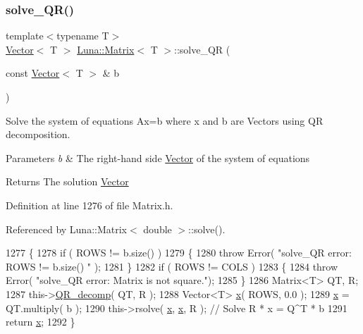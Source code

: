 \subsubsection{\texorpdfstring{solve\+\_\+\+Q\+R()}{solve\_QR()}}
{\footnotesize\ttfamily template$<$typename T$>$ \\
\hyperlink{classLuna_1_1Vector}{Vector}$<$ T $>$ \hyperlink{classLuna_1_1Matrix}{Luna\+::\+Matrix}$<$ T $>$\+::solve\+\_\+\+QR (\begin{DoxyParamCaption}\item[{const \hyperlink{classLuna_1_1Vector}{Vector}$<$ T $>$ \&}]{b }\end{DoxyParamCaption})\hspace{0.3cm}{\ttfamily [inline]}}



Solve the system of equations Ax=b where x and b are Vectors using QR decomposition. 


\begin{DoxyParams}{Parameters}
{\em b} & The right-\/hand side \hyperlink{classLuna_1_1Vector}{Vector} of the system of equations \\
\hline
\end{DoxyParams}
\begin{DoxyReturn}{Returns}
The solution \hyperlink{classLuna_1_1Vector}{Vector} 
\end{DoxyReturn}


Definition at line 1276 of file Matrix.\+h.



Referenced by Luna\+::\+Matrix$<$ double $>$\+::solve().


\begin{DoxyCode}
1277   \{
1278     \textcolor{keywordflow}{if} ( ROWS != b.size() )
1279     \{
1280       \textcolor{keywordflow}{throw} Error( \textcolor{stringliteral}{"solve\_QR error: ROWS != b.size() "} );
1281     \}
1282     \textcolor{keywordflow}{if} ( ROWS != COLS )
1283     \{
1284       \textcolor{keywordflow}{throw} Error( \textcolor{stringliteral}{"solve\_QR error: Matrix is not square."});
1285     \}
1286     Matrix<T> QT, R;
1287     this->\hyperlink{classLuna_1_1Matrix_aad8367cf9e292301e40c24c4011a2e8f}{QR\_decomp}( QT, R );
1288     Vector<T> \hyperlink{namespaceHeat__plot_aa88370c16b85b784ccbde3ed88bc1991}{x}( ROWS, 0.0 );
1289     \hyperlink{namespaceHeat__plot_aa88370c16b85b784ccbde3ed88bc1991}{x} = QT.multiply( b );
1290     this->rsolve( \hyperlink{namespaceHeat__plot_aa88370c16b85b784ccbde3ed88bc1991}{x}, \hyperlink{namespaceHeat__plot_aa88370c16b85b784ccbde3ed88bc1991}{x}, R );            \textcolor{comment}{// Solve R * x = Q^T * b}
1291     \textcolor{keywordflow}{return} \hyperlink{namespaceHeat__plot_aa88370c16b85b784ccbde3ed88bc1991}{x};
1292   \}
\end{DoxyCode}
\mbox{\label{classLuna_1_1Matrix_a728f479ceacf5f2d9e7b2d72baf1c798}} 
